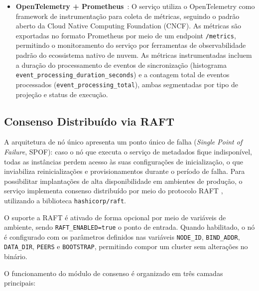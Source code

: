 \begin{itemize}
    \item \textbf{OpenTelemetry + Prometheus}~\citep{opentelemetry2024, prometheus2024}: O serviço utiliza o OpenTelemetry como framework de instrumentação para coleta de métricas, seguindo o padrão aberto da Cloud Native Computing Foundation (CNCF). As métricas são exportadas no formato Prometheus por meio de um endpoint \texttt{/metrics}, permitindo o monitoramento do serviço por ferramentas de observabilidade padrão do ecossistema nativo de nuvem. As métricas instrumentadas incluem a duração do processamento de eventos de sincronização (histograma \texttt{event\_processing\_duration\_seconds}) e a contagem total de eventos processados (\texttt{event\_processing\_total}), ambas segmentadas por tipo de projeção e status de execução.
\end{itemize}

\subsection{Consenso Distribuído via RAFT}
\label{subsec_raft}

A arquitetura de nó único apresenta um ponto único de falha (\textit{Single Point of Failure}, SPOF): caso o nó que executa o serviço de metadados fique indisponível, todas as instâncias perdem acesso às suas configurações de inicialização, o que inviabiliza reinicializações e provisionamentos durante o período de falha. Para possibilitar implantações de alta disponibilidade em ambientes de produção, o serviço implementa consenso distribuído por meio do protocolo RAFT \citep{ongaro2014raft}, utilizando a biblioteca \texttt{hashicorp/raft}.

O suporte a RAFT é ativado de forma opcional por meio de variáveis de ambiente, sendo \texttt{RAFT\_ENABLED=true} o ponto de entrada. Quando habilitado, o nó é configurado com os parâmetros definidos nas variáveis \texttt{NODE\_ID}, \texttt{BIND\_ADDR}, \texttt{DATA\_DIR}, \texttt{PEERS} e \texttt{BOOTSTRAP}, permitindo compor um cluster sem alterações no binário.

O funcionamento do módulo de consenso é organizado em três camadas principais:

